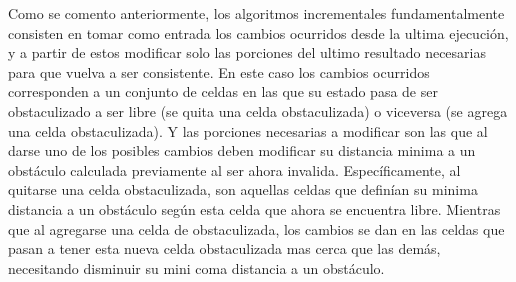 Como se comento anteriormente, los algoritmos incrementales fundamentalmente consisten en tomar como entrada los cambios ocurridos desde la ultima ejecución, y a partir de estos modificar solo las porciones del ultimo resultado necesarias para que vuelva a ser consistente. En este caso los cambios ocurridos corresponden a un conjunto de celdas en las que su estado pasa de ser obstaculizado a ser libre (se quita una celda obstaculizada) o viceversa (se agrega una celda obstaculizada). Y las porciones necesarias a modificar son las que al darse uno de los posibles cambios deben modificar su distancia minima a un obstáculo calculada previamente al ser ahora invalida. Específicamente, al quitarse una celda obstaculizada, son aquellas celdas que definían su minima distancia a un obstáculo según esta celda que ahora se encuentra libre. Mientras que al agregarse una celda de obstaculizada, los cambios se dan en las celdas que pasan a tener esta nueva celda obstaculizada mas cerca que las demás, necesitando disminuir su mini coma distancia a un obstáculo.

